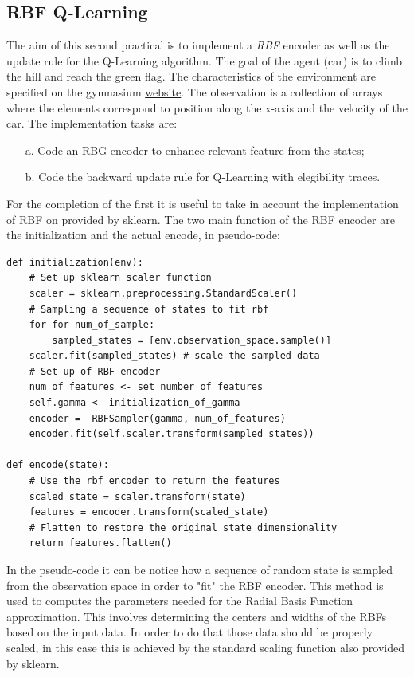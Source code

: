 \documentclass[10pt,a4paper]{article}
\begin{document}
\subsection{RBF Q-Learning}
The aim of this second practical is to implement a \textit{RBF} encoder as well as the update rule for the Q-Learning algorithm. The goal of the agent (car) is to climb the hill and reach the green flag. The characteristics of the environment are specified on the gymnasium \href{https://gymnasium.farama.org/environments/classic_control/mountain_car/}{\underline{website}}. The observation is a collection of arrays where the elements correspond to position  along the x-axis and the velocity of the car.
 The implementation tasks are:
\begin{itemize}
    \item[a.] Code an RBG encoder to enhance relevant feature from the states;
    \item[b.] Code the backward update rule for Q-Learning with elegibility traces.
\end{itemize}

\noindent For the completion of the first it is useful to take in account the implementation of RBF on provided by sklearn. The two main function of the RBF encoder are the initialization and the actual encode, in  pseudo-code:
\begin{lstlisting}
def initialization(env):
    # Set up sklearn scaler function
    scaler = sklearn.preprocessing.StandardScaler()
    # Sampling a sequence of states to fit rbf
    for for num_of_sample:
        sampled_states = [env.observation_space.sample()]
    scaler.fit(sampled_states) # scale the sampled data
    # Set up of RBF encoder
    num_of_features <- set_number_of_features
    self.gamma <- initialization_of_gamma
    encoder =  RBFSampler(gamma, num_of_features)
    encoder.fit(self.scaler.transform(sampled_states))

def encode(state):
    # Use the rbf encoder to return the features
    scaled_state = scaler.transform(state)
    features = encoder.transform(scaled_state)
    # Flatten to restore the original state dimensionality
    return features.flatten() 
\end{lstlisting}

\noindent In the pseudo-code it can be notice how a sequence of random state is sampled from the observation space in order to "fit" the RBF encoder. This method is used to computes the parameters needed for the Radial Basis Function approximation. This involves determining the centers and widths of the RBFs based on the input data. In order to do that those data should be properly scaled, in this case this is achieved by the standard scaling function also provided by sklearn.
\end{document}
